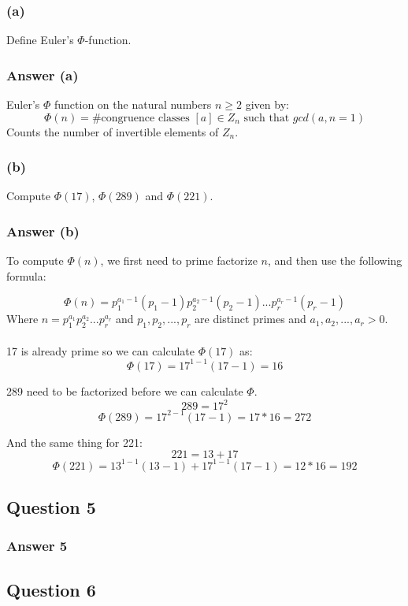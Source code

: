 \documentclass{article}
\begin{document}
	\subsubsection*{(a)}
	Define Euler’s $\Phi$-function.
	
	\subsubsection*{Answer (a)}
	Euler's $\Phi$ function on the natural numbers $n \geq 2$ given by:
	$$
	\Phi(n) =  \text{\# congruence classes } [a] \in Z_n \text{ such that }gcd(a,n = 1)
	$$
	Counts the number of invertible elements of $Z_n$. 
	
	\subsubsection*{(b)}
	Compute $\Phi(17)$, $\Phi(289)$ and $\Phi(221)$.
	
	\subsubsection*{Answer (b)}
	To compute $\Phi(n)$, we first need to prime factorize $n$, and then use the following formula:

	$$
	\Phi(n) = p_{1}^{a_1-1}(p_1-1)p_{2}^{a_2-1}(p_2-1)...p_{r}^{a_r-1}(p_r-1)
	$$
	Where $n = p_{1}^{a_1}p_{2}^{a_2}...p_{r}^{a_r}$ and $p_1,p_2,...,p_r$ are distinct primes and $a_1,a_2,...,a_r > 0$. 
	\\\\
	17 is already prime so we can calculate $\Phi(17)$ as:
	$$
	\Phi(17) = 17^{1-1}(17-1) = 16
	$$

	289 need to be factorized before we can calculate $\Phi$.
	$$
	289 = 17^2
	$$
	$$
	\Phi(289) = 17^{2-1}(17-1) 
	= 17*16 
	= 272
	$$
	
	And the same thing for 221:
	$$
	221 = 13 + 17
	$$
	$$
	\Phi(221) = 13^{1-1}(13-1) + 17^{1-1}(17-1) = 12*16 = 192
	$$
	
	\subsection*{Question 5}
	
	
	\subsubsection*{Answer 5}
	
	
	\subsection*{Question 6}
\end{document}

